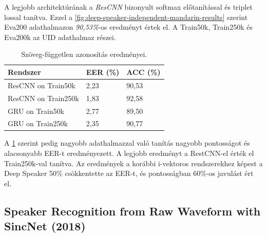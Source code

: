A legjobb architektúrának a \emph{ResCNN} bizonyult softmax előtanítással és triplet lossal tanítva. Ezzel a \ref{fig:deep-speaker-independent-mandarin-results} szerint Eva200 adathalmazon \emph{90,53\%}-os eredményt értek el. A Train50k, Train250k és Eva200k az UID adathalmaz részei.

\begin{table}[!ht]
	\begin{tabular}{*3l} \toprule
		\bfseries Rendszer & \bfseries EER (\%) & \bfseries ACC (\%) \\ \midrule
		ResCNN on Train50k & 2,23 & 90,53 \\
		\rowcolor{gray!10} 
		ResCNN on Train250k & 1,83 & 92,58 \\
		GRU on Train50k & 2,77 & 89,50 \\
		\rowcolor{gray!10} 
		GRU on Train250k & 2,35 & 90,77 \\
		\bottomrule
		\hline
	\end{tabular}
	\centering
	\caption{Szöveg-független azonosítás eredményei.}
	\label{fig:deep-speaker-independent}
\end{table}

A \ref{fig:deep-speaker-independent} szerint pedig nagyobb adathalmazzal való tanítás nagyobb pontosságot és alacsonyabb EER-t eredményezett. A legjobb eredményt a RestCNN-el érték el Train250k-val tanítva.
\newline
\newline
Az eredmények a korábbi i-vektoros rendszerekhez képest a Deep Speaker 50\% csökkentette az EER-t, és pontosságban 60\%-os javulást ért el.

\subsection{Speaker Recognition from Raw Waveform with SincNet (2018)}

